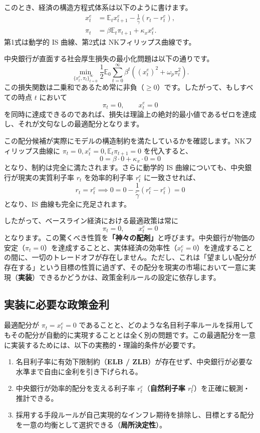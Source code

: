 \documentclass[
  japanese,
  lualatex,
  ja=standard,
  12pt,
  a4paper]{ltjsarticle}
\providecommand{\tightlist}{%
  \setlength{\itemsep}{0pt}\setlength{\parskip}{0pt}}
\begin{document}
このとき、経済の構造方程式体系は以下のように書けます。 \[
\begin{aligned}
x_t^e
&=
\mathbb{E}_t x_{t+1}^e
-\frac{1}{\tilde{\gamma}}(r_t-r_t^e),\\
\pi_t
&=
\beta\mathbb{E}_t\pi_{t+1}
+\kappa_x x_t^e.
\end{aligned}
\] 第1式は動学的 IS 曲線、第2式は NKフィリップス曲線です。

中央銀行が直面する社会厚生損失の最小化問題は以下の通りです。 \[
\min_{\{x_t^e,\pi_t\}_{t=0}^\infty}
\frac{1}{2}
\mathbb{E}_0
\sum_{t=0}^{\infty}
\beta^t
\left(
\left(x_t^e\right)^2+\omega_p\pi_t^2
\right).
\]
この損失関数は二乗和であるため常に非負（\(\geq 0\)）です。したがって、もしすべての時点
\(t\) において \[
\pi_t=0,
\qquad
x_t^e=0
\]
を同時に達成できるのであれば、損失は理論上の絶対的最小値であるゼロを達成し、それが文句なしの最適配分となります。

この配分候補が実際にモデルの構造制約を満たしているかを確認します。NKフィリップス曲線に
\(\pi_t=0, x_t^e=0, \mathbb{E}_t\pi_{t+1}=0\) を代入すると、 \[
0=\beta\cdot 0+\kappa_x\cdot 0 = 0
\] となり、制約は完全に満たされます。さらに動学的 IS
曲線についても、中央銀行が現実の実質利子率 \(r_t\) を効率的利子率
\(r_t^e\) に一致させれば、 \[
r_t=r_t^e \implies 0=0-\frac{1}{\tilde{\gamma}}(r_t^e-r_t^e) = 0
\] となり、IS 曲線も完全に充足されます。

したがって、ベースライン経済における最適政策は常に \[
\pi_t=0,
\qquad
x_t^e=0
\]
となります。この驚くべき性質を\textbf{「神々の配剤」}と呼びます。中央銀行が物価の安定（\textbf{\(\pi_t=0\)}）を達成することと、実体経済の効率性（\textbf{\(x_t^e=0\)}）を達成することの間に、一切のトレードオフが存在しません。ただし、これは「望ましい配分が存在する」という目標の性質に過ぎず、その配分を現実の市場において一意に実現（\textbf{実装}）できるかどうかは、政策金利ルールの設定に依存します。

\subsection{実装に必要な政策金利}\label{ux5b9fux88c5ux306bux5fc5ux8981ux306aux653fux7b56ux91d1ux5229}

最適配分が \(\pi_t=x_t^e=0\)
であることと、どのような名目利子率ルールを採用してもその配分が自動的に実現することとは全く別の問題です。この最適配分を一意に実装するためには、以下の実務的・理論的条件が必要です。

\begin{enumerate}
\def\labelenumi{\arabic{enumi}.}
\tightlist
\item
  名目利子率に有効下限制約（\textbf{ELB /
  ZLB}）が存在せず、中央銀行が必要な水準まで自由に金利を引き下げられる。
\item
  中央銀行が効率的配分を支える利子率 \(r_t^e\)（\textbf{自然利子率
  \(r_t^f\)}）を正確に観測・推計できる。
\item
  採用する手段ルールが自己実現的なインフレ期待を排除し、目標とする配分を一意の均衡として選択できる（\textbf{局所決定性}）。
\end{enumerate}
\end{document}
